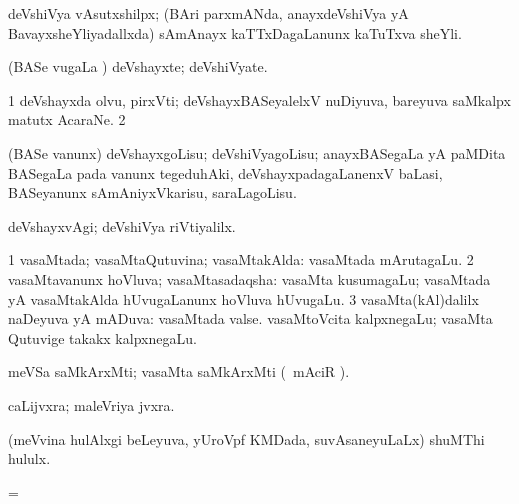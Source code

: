 {{{\bentry
{}
\gl{\nA}
\expl{}
\bmng
 deVshiVya vAsutxshilpx; (BAri parxmANda, anayxdeVshiVya yA BavayxsheYliyadallxda) sAmAnayx kaTTxDagaLanunx kaTuTxva sheYli. 
\emng
\eentry

\bentry
{} 
\gl{\sakirx}
\expl{}
\bmng
\emng
\eentry

\bentry 
{} 
\gl{\nA}
\expl{}
\bmng
 (BASe \mo vugaLa \vi) deVshayxte; deVshiVyate. 
\emng
\eentry

\bentry
{} 
\gl{\nA}
\expl{}
\bmng
\bnum
\num{1} deVshayxda olvu, pirxVti; deVshayxBASeyalelxV nuDiyuva, bareyuva saMkalpx matutx AcaraNe. 
\num{2}  
\enum
\emng
\eentry

\bentry
{} 
\gl{\sakirx}
\expl{}
\bmng
 (BASe \mo vanunx) deVshayxgoLisu; deVshiVyagoLisu; anayxBASegaLa yA paMDita BASegaLa pada \mo vanunx tegeduhAki, deVshayxpadagaLanenxV baLasi, BASeyanunx sAmAniyxVkarisu, saraLagoLisu. 
\emng
\eentry

\bentry
{} 
\gl{\kirxvi}
\expl{}
\bmng
 deVshayxvAgi; deVshiVya riVtiyalilx. 
\emng
\eentry

\bentry
{} 
\gl{\gu}
\expl{}
\bmng
\bnum
\num{1} vasaMtada; vasaMtaQutuvina; vasaMtakAlda:  vasaMtada mArutagaLu. 
\num{2} vasaMtavanunx hoVluva; vasaMtasadaqsha:  vasaMta kusumagaLu; vasaMtada yA vasaMtakAlda hUvugaLanunx hoVluva hUvugaLu. 
\num{3} vasaMta(kAl)dalilx naDeyuva yA mADuva:  vasaMtada valse.  vasaMtoVcita kalpxnegaLu; vasaMta Qutuvige takakx kalpxnegaLu. 
\enum
\emng
\eentry

\bentry
{}
\gl{\nA}
\expl{}
\bmng
 meVSa saMkArxMti; vasaMta saMkArxMti (\su\ mAciR ). 
\emng
\eentry

\bentry
{}
\gl{\nA}
\expl{}
\bmng
 caLijvxra; maleVriya jvxra. 
\emng
\eentry

\bentry
{} 
\gl{\nA}
\expl{}
\bmng
 (meVvina hulAlxgi beLeyuva, yUroVpf KMDada, suvAsaneyuLaLx) shuMThi hululx. 
\emng
\eentry

\bentry
{} 
\gl{\nA}
\expl{}
\bmng
 =  
\emng
\eentry

}}}
